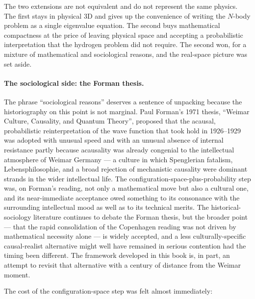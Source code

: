 The two extensions are not equivalent and do not represent the same physics. The first stays in physical 3D and gives up the convenience of writing the $N$-body problem as a single eigenvalue equation. The second buys mathematical compactness at the price of leaving physical space and accepting a probabilistic interpretation that the hydrogen problem did not require. The second won, for a mixture of mathematical and sociological reasons, and the real-space picture was set aside.

\paragraph{The sociological side: the Forman thesis.}
The phrase ``sociological reasons'' deserves a sentence of unpacking because the historiography on this point is not marginal. Paul Forman's 1971 thesis, ``Weimar Culture, Causality, and Quantum Theory'', proposed that the acausal, probabilistic reinterpretation of the wave function that took hold in 1926--1929 was adopted with unusual speed and with an unusual absence of internal resistance partly because acausality was already congenial to the intellectual atmosphere of Weimar Germany --- a culture in which Spenglerian fatalism, Lebensphilosophie, and a broad rejection of mechanistic causality were dominant strands in the wider intellectual life. The configuration-space-plus-probability step was, on Forman's reading, not only a mathematical move but also a cultural one, and its near-immediate acceptance owed something to its consonance with the surrounding intellectual mood as well as to its technical merits. The historical-sociology literature continues to debate the Forman thesis, but the broader point --- that the rapid consolidation of the Copenhagen reading was not driven by mathematical necessity alone --- is widely accepted, and a less culturally-specific causal-realist alternative might well have remained in serious contention had the timing been different. The framework developed in this book is, in part, an attempt to revisit that alternative with a century of distance from the Weimar moment.

The cost of the configuration-space step was felt almost immediately:

